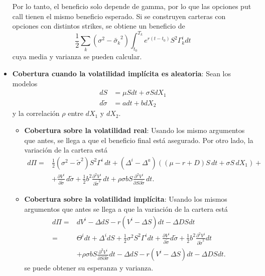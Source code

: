 \begin{itemize}
    Por lo tanto, el beneficio solo depende de gamma, por lo que las opciones put call tienen el mismo beneficio esperado. Si se construyen carteras con opciones con distintos strikes, se obtiene un beneficio de
    \[
        \frac{1}{2}\sum_k(\sigma^2 - \tilde{\sigma_k}^2) \int_{t_0}^{T_k} e^{r(t-t_0)}S^2 \Gamma^i_k dt
    \]
    cuya media y varianza se pueden calcular.
    \item \textbf{Cobertura cuando la volatilidad implícita es aleatoria}: Sean los modelos
    \begin{align*}
        dS &= \mu S dt + \sigma S dX_1 \\
        d\tilde{\sigma} &= a dt + b dX_2
    \end{align*}
    y la correlación $\rho$ entre $dX_1$ y $dX_2$.
    \begin{itemize}
        \item \textbf{Cobertura sobre la volatilidad real}: Usando los mismo argumentos que antes, se llega a que el beneficio final está asegurado. Por otro lado, la variación de la cartera está
        \begin{align*}
            d\Pi =& \frac{1}{2}(\sigma^2 - \tilde{\sigma}^2)S^2 \Gamma^i\, dt + (\Delta^i - \Delta^a)\left( (\mu - r + D)S\, dt + \sigma S\, dX_1 \right) + \\
            &+\frac{\partial V^i}{\partial \tilde{\sigma}}\, d\tilde{\sigma} + \frac{1}{2} b^2 \frac{\partial^2 V^i}{\partial \tilde{\sigma}^2}\, dt + \rho \sigma b S \frac{\partial^2 V^i}{\partial S \partial \tilde{\sigma}}\, dt.
        \end{align*}
        \item \textbf{Cobertura sobre la volatilidad implícita}: Usando los mismos argumentos que antes se llega a que la variación de la cartera está
        \begin{align*}
        d\Pi =&dV^i - \Delta dS - r(V^i - \Delta S)dt - \Delta D S dt\\
        =& \Theta^i dt + \Delta^i dS + \frac{1}{2} \sigma^2 S^2 \Gamma^i dt + \frac{\partial V^i}{\partial \tilde{\sigma}} d\tilde{\sigma} + \frac{1}{2} b^2 \frac{\partial^2 V^i}{\partial \tilde{\sigma}^2} dt \\
        &+ \rho \sigma b S \frac{\partial^2 V^i}{\partial S \partial \tilde{\sigma}} dt - \Delta dS - r(V^i - \Delta S)dt - \Delta D S dt.
        \end{align*}
        se puede obtener su esperanza y varianza.
    \end{itemize}
\end{itemize}

